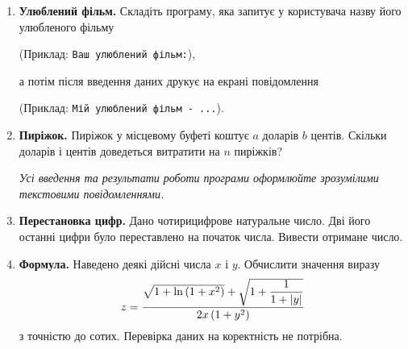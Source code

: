 \begin{enumerate}

\item \textbf{Улюблений фільм.} Складіть програму, яка запитує у користувача назву його улюбленого фільму

(Приклад: \verb|Ваш улюблений фільм:|),

а потім після введення даних друкує на екрані повідомлення

(Приклад: \verb|Мій улюблений фільм - ...|).

\item \textbf{Пиріжок.} Пиріжок у місцевому буфеті коштує $a$ доларів $b$ центів. Скільки доларів і центів доведеться витратити на $n$ пиріжків?

{\itshape Усі введення та результати роботи програми оформлюйте зрозумілими текстовими повідомленнями.}

\item \textbf{Перестановка цифр.} Дано чотирицифрове натуральне число. Дві його останні цифри було переставлено на початок числа. Вивести отримане число.

\item \textbf{Формула.} Наведено деякі дійсні числа $x$ і $y$. Обчислити значення виразу
$$
z=\dfrac{\sqrt{\mathstrut 1+\ln \left(1+x^2\right)}+\sqrt{\mathstrut 1+\dfrac{1}{1+|y|}}}{2x \,(1+y^2)}
$$
з точністю до сотих. Перевірка даних на коректність не потрібна.
\end{enumerate}





